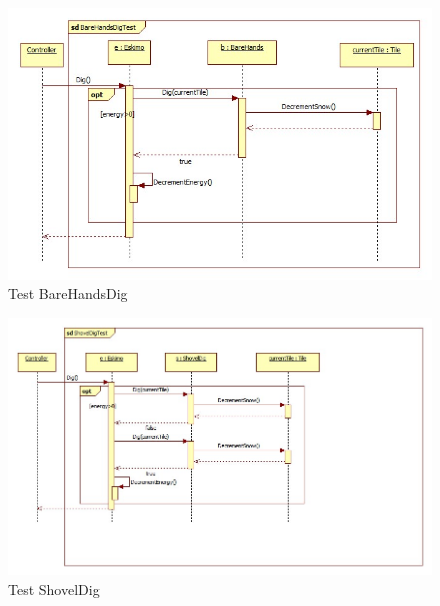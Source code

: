 \begin{figure}[h]
	\begin{center}
		\includegraphics[width=17cm]{chapters/chapter05/diagrams/TestBareHandsDig.jpg}
		\caption{Test BareHandsDig}
		\label{fig:Test BareHandsDig}
	\end{center}
\end{figure}

\begin{figure}[h]
	\begin{center}
		\includegraphics[width=17cm]{chapters/chapter05/diagrams/TestShovelDig.jpg}
		\caption{Test ShovelDig}
		\label{fig:Test ShovelDig}
	\end{center}
\end{figure}

